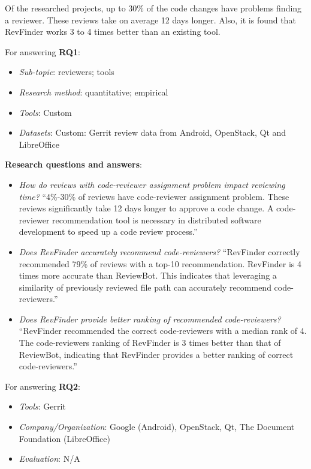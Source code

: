 \documentclass[]{book}
\providecommand{\tightlist}{%
  \setlength{\itemsep}{0pt}\setlength{\parskip}{0pt}}
\begin{document}
Of the researched projects, up to 30\% of the code changes have problems
finding a reviewer. These reviews take on average 12 days longer. Also,
it is found that RevFinder works 3 to 4 times better than an existing
tool.

For answering \textbf{RQ1}:

\begin{itemize}
\tightlist
\item
  \emph{Sub-topic}: reviewers; tools
\item
  \emph{Research method}: quantitative; empirical
\item
  \emph{Tools}: Custom
\item
  \emph{Datasets}: Custom: Gerrit review data from Android, OpenStack,
  Qt and LibreOffice
\end{itemize}

\textbf{Research questions and answers}:

\begin{itemize}
\tightlist
\item
  \emph{How do reviews with code-reviewer assignment problem impact
  reviewing time?} ``4\%-30\% of reviews have code-reviewer assignment
  problem. These reviews significantly take 12 days longer to approve a
  code change. A code-reviewer recommendation tool is necessary in
  distributed software development to speed up a code review process.''
\item
  \emph{Does RevFinder accurately recommend code-reviewers?} ``RevFinder
  correctly recommended 79\% of reviews with a top-10 recommendation.
  RevFinder is 4 times more accurate than ReviewBot. This indicates that
  leveraging a similarity of previously reviewed file path can
  accurately recommend code-reviewers.''
\item
  \emph{Does RevFinder provide better ranking of recommended
  code-reviewers?} ``RevFinder recommended the correct code-reviewers
  with a median rank of 4. The code-reviewers ranking of RevFinder is 3
  times better than that of ReviewBot, indicating that RevFinder
  provides a better ranking of correct code-reviewers.''
\end{itemize}

For answering \textbf{RQ2}:

\begin{itemize}
\tightlist
\item
  \emph{Tools}: Gerrit
\item
  \emph{Company/Organization}: Google (Android), OpenStack, Qt, The
  Document Foundation (LibreOffice)
\item
  \emph{Evaluation}: N/A
\end{itemize}
\end{document}

